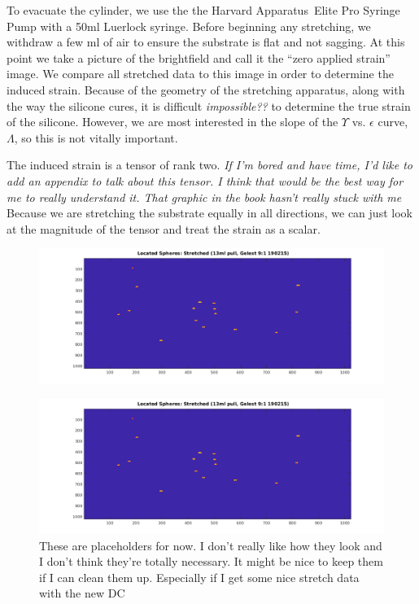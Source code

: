 To evacuate the cylinder, we use the the Harvard Apparatus\texttrademark \ Elite Pro Syringe Pump with a 50ml Luerlock syringe. Before beginning any stretching, we withdraw a few ml of air to ensure the substrate is flat and not sagging. At this point we take a picture of the brightfield and call it the ``zero applied strain'' image. We compare all stretched data to this image in order to determine the induced strain. Because of the geometry of the stretching apparatus, along with the way the silicone cures, it is difficult \emph{impossible??} to determine the true strain of the silicone. However, we are most interested in the slope of the $\Upsilon$ vs. $\epsilon$ curve, $\Lambda$, so this is not vitally important.

The induced strain is a tensor of rank two. \emph{If I'm bored and have time, I'd like to add an appendix to talk about this tensor. I think that would be the best way for me to really understand it. That graphic in the book hasn't really stuck with me} Because we are stretching the substrate equally in all directions, we can just look at the magnitude of the tensor and treat the strain as a scalar.     

 
\begin{figure}[h!]
	\centering
	\includegraphics[width=\linewidth]{Chapters/Figures/13ml_stretched_2D_located}
	\caption[Unstretched]{}
	\label{fig:13mlstretched2dlocated}
\end{figure}

\begin{figure}[h!]
	\centering
	\includegraphics[width=\linewidth]{Chapters/Figures/13ml_stretched_2D_located}
	\caption[Stretched]{These are placeholders for now. I don't really like how they look and I don't think they're totally necessary. It might be nice to keep them if I can clean them up. Especially if I get some nice stretch data with the new DC}
	\label{fig:13mlstretched2dlocated}
\end{figure}

%